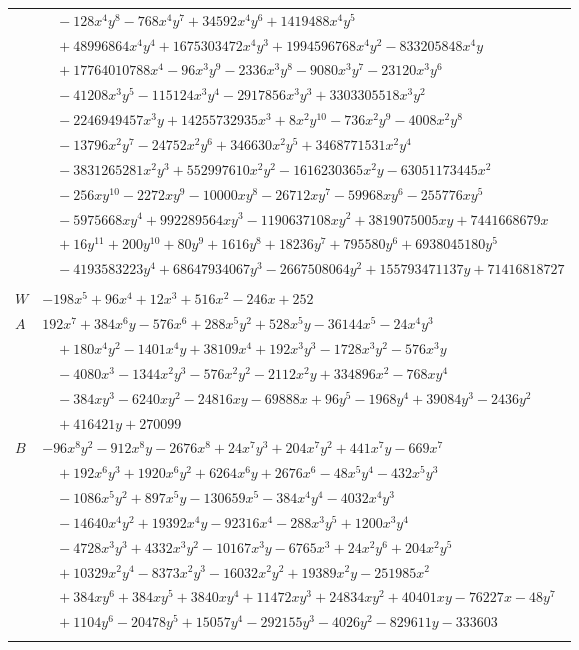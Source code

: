 \documentclass[11pt]{article}
\begin{document}
\begin{longtable}{@{}ll@{}}
 & $\quad -128x^{4}y^{8}-768x^{4}y^{7}+34592x^{4}y^{6}+1419488x^{4}y^{5}$\\
 & $\quad +48996864x^{4}y^{4}+1675303472x^{4}y^{3}+1994596768x^{4}y^{2}-833205848x^{4}y$\\
 & $\quad +17764010788x^{4}-96x^{3}y^{9}-2336x^{3}y^{8}-9080x^{3}y^{7}-23120x^{3}y^{6}$\\
 & $\quad -41208x^{3}y^{5}-115124x^{3}y^{4}-2917856x^{3}y^{3}+3303305518x^{3}y^{2}$\\
 & $\quad -2246949457x^{3}y+14255732935x^{3}+8x^{2}y^{10}-736x^{2}y^{9}-4008x^{2}y^{8}$\\
 & $\quad -13796x^{2}y^{7}-24752x^{2}y^{6}+346630x^{2}y^{5}+3468771531x^{2}y^{4}$\\
 & $\quad -3831265281x^{2}y^{3}+552997610x^{2}y^{2}-1616230365x^{2}y-63051173445x^{2}$\\
 & $\quad -256xy^{10}-2272xy^{9}-10000xy^{8}-26712xy^{7}-59968xy^{6}-255776xy^{5}$\\
 & $\quad -5975668xy^{4}+992289564xy^{3}-1190637108xy^{2}+3819075005xy+7441668679x$\\
 & $\quad +16y^{11}+200y^{10}+80y^{9}+1616y^{8}+18236y^{7}+795580y^{6}+6938045180y^{5}$\\
 & $\quad -4193583223y^{4}+68647934067y^{3}-2667508064y^{2}+155793471137y+71416818727$\\
\addlinespace[3pt]
\multicolumn{2}{@{}l}{$g=2$, $i=42$, $m=8$, neighbours $46,8,14,20,23,32,34,39$}\\
$W$ & $-198x^{5}+96x^{4}+12x^{3}+516x^{2}-246x+252$\\
$A$ & $192x^{7}+384x^{6}y-576x^{6}+288x^{5}y^{2}+528x^{5}y-36144x^{5}-24x^{4}y^{3}$\\
 & $\quad +180x^{4}y^{2}-1401x^{4}y+38109x^{4}+192x^{3}y^{3}-1728x^{3}y^{2}-576x^{3}y$\\
 & $\quad -4080x^{3}-1344x^{2}y^{3}-576x^{2}y^{2}-2112x^{2}y+334896x^{2}-768xy^{4}$\\
 & $\quad -384xy^{3}-6240xy^{2}-24816xy-69888x+96y^{5}-1968y^{4}+39084y^{3}-2436y^{2}$\\
 & $\quad +416421y+270099$\\
$B$ & $-96x^{8}y^{2}-912x^{8}y-2676x^{8}+24x^{7}y^{3}+204x^{7}y^{2}+441x^{7}y-669x^{7}$\\
 & $\quad +192x^{6}y^{3}+1920x^{6}y^{2}+6264x^{6}y+2676x^{6}-48x^{5}y^{4}-432x^{5}y^{3}$\\
 & $\quad -1086x^{5}y^{2}+897x^{5}y-130659x^{5}-384x^{4}y^{4}-4032x^{4}y^{3}$\\
 & $\quad -14640x^{4}y^{2}+19392x^{4}y-92316x^{4}-288x^{3}y^{5}+1200x^{3}y^{4}$\\
 & $\quad -4728x^{3}y^{3}+4332x^{3}y^{2}-10167x^{3}y-6765x^{3}+24x^{2}y^{6}+204x^{2}y^{5}$\\
 & $\quad +10329x^{2}y^{4}-8373x^{2}y^{3}-16032x^{2}y^{2}+19389x^{2}y-251985x^{2}$\\
 & $\quad +384xy^{6}+384xy^{5}+3840xy^{4}+11472xy^{3}+24834xy^{2}+40401xy-76227x-48y^{7}$\\
 & $\quad +1104y^{6}-20478y^{5}+15057y^{4}-292155y^{3}-4026y^{2}-829611y-333603$\\
\addlinespace[3pt]
\end{longtable}
\endgroup
\end{document}
